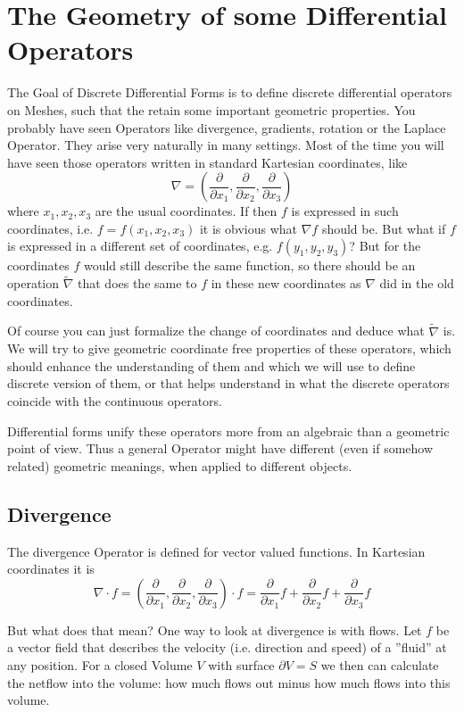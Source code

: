 \section{The Geometry of some Differential Operators}

The Goal of Discrete Differential Forms is to define discrete differential operators on Meshes, such that the retain some important geometric properties. 
You probably have seen Operators like divergence, gradients, rotation or the Laplace Operator. They arise very naturally in many settings. Most of the time you will have seen those operators written in standard Kartesian coordinates, like
\[\nabla = (\frac{ \partial}{\partial x_1},\frac{ \partial}{\partial x_2},\frac{ \partial}{\partial x_3})\]
where $x_1, x_2, x_3$ are the usual coordinates. If then $f$ is expressed in such coordinates, i.e. $f = f(x_1,x_2,x_3)$ it is obvious what $\nabla f$ should be. But what if $f$ is expressed in a different set of coordinates, e.g. $f(y_1,y_2,y_3)$? But for the coordinates $f$ would still describe the same function, so there should be an operation $\tilde{\nabla}$ that does the same to $f$ in these new coordinates as $\nabla$ did in the old coordinates.

Of course you can just formalize the change of coordinates and deduce what $\tilde{\nabla}$ is. We will try to give geometric coordinate free properties of these operators, which should enhance the understanding of them and which we will use to define discrete version of them, or that helps understand in what the discrete operators coincide with the continuous operators.

Differential forms unify these operators more from an algebraic than a geometric point of view. Thus a general Operator might have different (even if somehow related) geometric meanings, when applied to different objects.

\subsection{Divergence}

The divergence Operator is defined for vector valued functions. In Kartesian coordinates it is 
\[\nabla \cdot f = (\frac{ \partial}{\partial x_1},\frac{ \partial}{\partial x_2},\frac{ \partial}{\partial x_3})\cdot f = \frac{ \partial}{\partial x_1} f + \frac{ \partial}{\partial x_2}f + \frac{ \partial}{\partial x_3}f\]

But what does that mean? One way to look at divergence is with flows. Let $f$ be a vector field that describes the velocity (i.e. direction and speed) of a ''fluid'' at any position. For a closed Volume $V$ with surface $\partial V = S$ we then can calculate the netflow into the volume: how much flows out minus how much flows into this volume.

